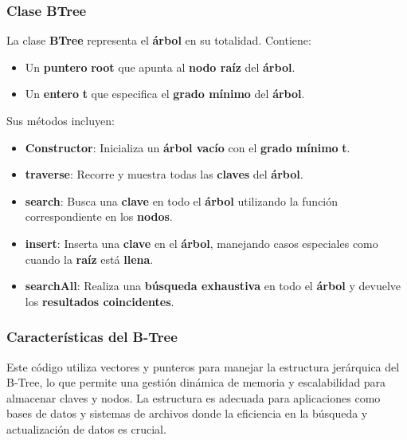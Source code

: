 \documentclass[corference]{IEEEtran}
\begin{document}
\begin{flushleft}
            
            \subsubsection{Clase BTree}
                \noindent\hspace*{4em}La clase \textbf{BTree} representa el \textbf{árbol} en su totalidad. Contiene:
                
                \begin{itemize}[left=4em]  %
                    \item Un \textbf{puntero} \textbf{root} que apunta al \textbf{nodo raíz} del \textbf{árbol}.
                    \item Un \textbf{entero} \textbf{t} que especifica el \textbf{grado mínimo} del \textbf{árbol}.
                \end{itemize}
                
                \noindent\hspace*{4em}Sus métodos incluyen:
                
                \begin{itemize}[left=4em]  %
                    \item \textbf{Constructor}: Inicializa un \textbf{árbol vacío} con el \textbf{grado mínimo} \textbf{t}.
                    \item \textbf{traverse}: Recorre y muestra todas las \textbf{claves} del \textbf{árbol}.
                    \item \textbf{search}: Busca una \textbf{clave} en todo el \textbf{árbol} utilizando la función correspondiente en los \textbf{nodos}.
                    \item \textbf{insert}: Inserta una \textbf{clave} en el \textbf{árbol}, manejando casos especiales como cuando la \textbf{raíz} está \textbf{llena}.
                    \item \textbf{searchAll}: Realiza una \textbf{búsqueda exhaustiva} en todo el \textbf{árbol} y devuelve los \textbf{resultados coincidentes}.
                \end{itemize}
            
            \subsubsection{Características del B-Tree}
                \noindent\hspace*{4em}Este código utiliza vectores y punteros para manejar la estructura jerárquica del B-Tree, lo que permite una gestión dinámica de memoria y escalabilidad para almacenar claves y nodos. La estructura es adecuada para aplicaciones como bases de datos y sistemas de archivos donde la eficiencia en la búsqueda y actualización de datos es crucial.
                

\end{flushleft}
\end{document}
